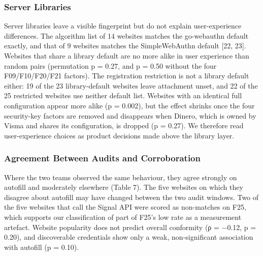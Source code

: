 \documentclass[letterpaper,twocolumn,10pt]{article}
\begin{document}
\subsubsection{Server Libraries}

Server libraries leave a visible fingerprint but do not explain user-experience differences. The algorithm list of 14 websites matches the go-webauthn default exactly, and that of 9 websites matches the SimpleWebAuthn default {[}22, 23{]}. Websites that share a library default are no more alike in user experience than random pairs (permutation p = 0.27, and p = 0.50 without the four F09/F10/F20/F21 factors). The registration restriction is not a library default either: 19 of the 23 library-default websites leave attachment unset, and 22 of the 25 restricted websites use neither default list. Websites with an identical full configuration appear more alike (p = 0.002), but the effect shrinks once the four security-key factors are removed and disappears when Dinero, which is owned by Visma and shares its configuration, is dropped (p = 0.27). We therefore read user-experience choices as product decisions made above the library layer.

\subsubsection{Agreement Between Audits and Corroboration}

Where the two teams observed the same behaviour, they agree strongly on autofill and moderately elsewhere (Table 7). The five websites on which they disagree about autofill may have changed between the two audit windows. Two of the five websites that call the Signal API were scored as non-matches on F25, which supports our classification of part of F25's low rate as a measurement artefact. Website popularity does not predict overall conformity (ρ = −0.12, p = 0.20), and discoverable credentials show only a weak, non-significant association with autofill (p = 0.10).
\end{document}

